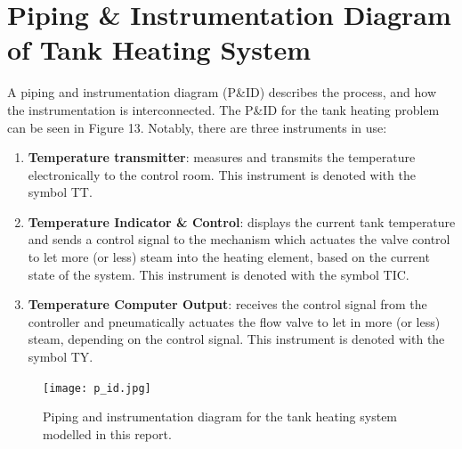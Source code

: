 \documentclass{article}
\begin{document}
\section{Piping \& Instrumentation Diagram of Tank Heating System}

A piping and instrumentation diagram (P\&ID) describes the process, and how the instrumentation is interconnected. The P\&ID for the tank heating problem can be seen in Figure 13. Notably, there are three instruments in use:
\begin{enumerate}
	\item \textbf{Temperature transmitter}: measures and transmits the temperature electronically to the control room. This instrument is denoted with the symbol TT.
	\item \textbf{Temperature Indicator \& Control}: displays the current tank temperature and sends a control signal to the mechanism which actuates the valve control to let more (or less) steam into the heating element, based on the current state of the system. This instrument is denoted with the symbol TIC.
	\item \textbf{Temperature Computer Output}: receives the control signal from the controller and pneumatically actuates the flow valve to let in more (or less) steam, depending on the control signal. This instrument is denoted with the symbol TY.
\end{enumerate}
\begin{figure}[h]
	\centering
	\texttt{[image: p\_id.jpg]}
	\caption{Piping and instrumentation diagram for the tank heating system modelled in this report.}
\end{figure}

\end{document}
